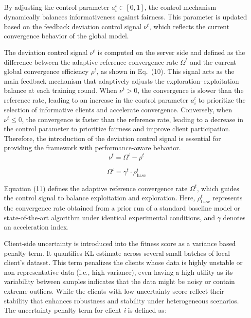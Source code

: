 \documentclass[pdflatex,sn-mathphys-num,oneside]{sn-jnl}%
\theoremstyle{thmstyleone}%
\theoremstyle{thmstyletwo}%
\theoremstyle{thmstylethree}%
\begin{document}
By adjusting the control parameter $a_i^t \in [0,1]$, the control mechanism dynamically balances informativeness against fairness. This parameter is updated based on the feedback deviation control signal $\nu^t$, which reflects the current convergence behavior of the global model.

The deviation control signal $\nu^t$ is computed on the server side and defined as the difference between the adaptive reference convergence rate $\Omega^t$ and the current global convergence efficiency $\rho^t$, as shown in Eq.~(10). This signal acts as the main feedback mechanism that adaptively adjusts the exploration--exploitation balance at each training round.
When $\nu^t > 0$, the convergence is slower than the reference rate, leading to an increase in the control parameter $a_i^t$ to prioritize the selection of informative clients and accelerate convergence. Conversely, when $\nu^t \le 0$, the convergence is faster than the reference rate, leading to a decrease in the control parameter to prioritize fairness and improve client participation.
Therefore, the introduction of the deviation control signal is essential for providing the framework with performance-aware behavior.
\begin{equation}
\nu^t = \Omega^t - \rho^t
\label{eq:deviation}
\end{equation}

\begin{equation}
\Omega^t = \gamma^t \cdot \rho_{\text{base}}^t
\label{eq:reference_rate}
\end{equation}

Equation (11) defines the adaptive reference convergence rate $\Omega^t$, which guides the control signal to balance exploitation and exploration. Here, $\rho_{\text{base}}^t$ represents the convergence rate obtained from a prior run of a standard baseline model or state-of-the-art algorithm under identical experimental conditions, and $\gamma$ denotes an acceleration index.

Client-side uncertainty is introduced into the fitness score as a variance based penalty term. It quantifies KL estimate across several small batches of local client’s dataset. This term penalizes the clients whose data is highly unstable or non-representative data (i.e., high variance), even having a high utility as its variability between samples indicates that the data might be noisy or contain extreme outliers. While the clients with low uncertainty score reflect their stability that enhances robustness and stability under heterogeneous scenarios. The uncertainty penalty term for client \textit{i} is defined as:
\end{document}
